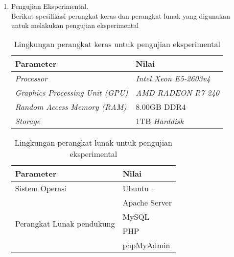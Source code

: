 \begin{enumerate}
	\item Pengujian Eksperimental. \\
	Berikut spesifikasi perangkat keras dan perangkat lunak yang digunakan untuk melakukan pengujian eksperimental
	\begin{table}[H] %
		\caption{Lingkungan perangkat keras untuk pengujian eksperimental}
		\centering
		\label{tab:lingkunganpkpe}
			\begin{tabular}{|l|l|}
				\hline
				\textbf{Parameter} & \textbf{Nilai} \\
				\hline
				\textit{Processor} & \textit{Intel Xeon E5-2603v4}\\
				\hline
				\textit{Graphics Processing Unit (GPU)} & \textit{AMD RADEON R7 240}\\
				\hline
				\textit{Random Access Memory (RAM)}& 8.00GB DDR4\\
				\hline
				\textit{Storage} & 1TB \textit{Harddisk}\\
				\hline
		\end{tabular}%
	\end{table}
	
	\begin{table}[h] %
		\caption{Lingkungan perangkat lunak untuk pengujian eksperimental}
		\label{tab:lingkunganplpe}
		\centering
			\begin{tabular}{|l|l|}
				\hline
				\textbf{Parameter} & \textbf{Nilai} \\
				\hline
				Sistem Operasi & Ubuntu --\\
				\hline
				\multirow{4}{*}{Perangkat Lunak pendukung} 	& Apache Server\\
															& MySQL \\
															& PHP\\
															& phpMyAdmin\\
				\hline
		\end{tabular}%
	\end{table}
\end{enumerate}

